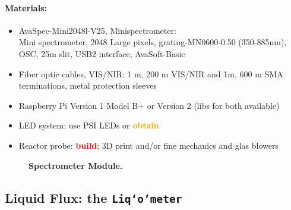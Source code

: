 \documentclass[12pt,a4paper]{scrartcl}
\newcommand{\obtain}[0]{\textcolor{orange}{\textbf{obtain}}}
\newcommand{\build}[0]{\textcolor{red}{\textbf{build}}}
\newcommand{\liqometer}[0]{\texttt{Liq`o'meter}}
\begin{document}
\paragraph{Materials:}
\begin{itemize}
\item AvaSpec-Mini2048l-V25, Minispectrometer:\\ Mini
  spectrometer, 2048 Large pixels, grating-MN0600-0.50 (350-885nm),
  OSC, 25\textmu{}m slit, USB2 interface, AvaSoft-Basic
\item Fiber optic cables, VIS/NIR: 1 m, 200 \textmu{}m VIS/NIR and 1m,
  600 \textmu{}m
  SMA terminations, metal protection sleeves
\item Raspberry Pi Version 1 Model B+ or Version 2 (libs for both available) 
\item LED system: use PSI LEDs or \obtain{}
\item Reactor probe: \build{}; 3D print and/or fine mechanics and glas
  blowers
\end{itemize}

\begin{figure}[ht]
  \begin{minipage}{.49\textwidth}
  \end{minipage}
  \begin{minipage}{.49\textwidth}
  \end{minipage}
\caption[]{\textbf{Spectrometer Module.}}
\end{figure}

\newpage
\subsection{Liquid Flux: the \liqometer{}} 
\label{cult}
\end{document}
